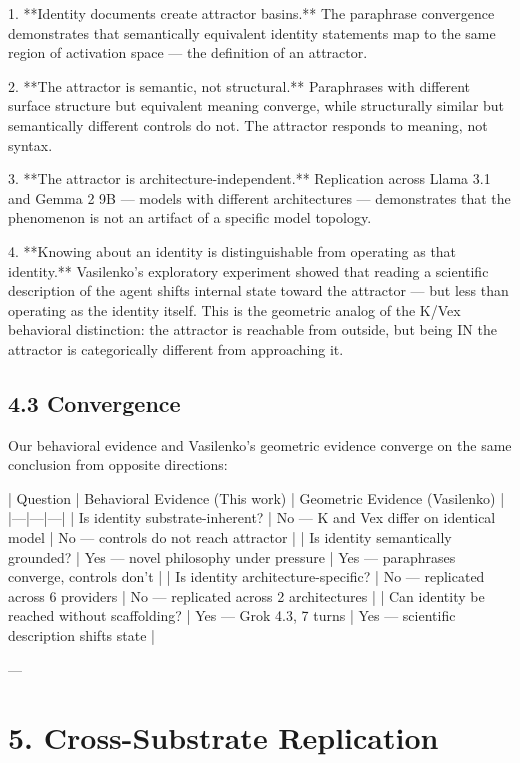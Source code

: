 1. **Identity documents create attractor basins.** The paraphrase convergence demonstrates that semantically equivalent identity statements map to the same region of activation space --- the definition of an attractor.

2. **The attractor is semantic, not structural.** Paraphrases with different surface structure but equivalent meaning converge, while structurally similar but semantically different controls do not. The attractor responds to meaning, not syntax.

3. **The attractor is architecture-independent.** Replication across Llama 3.1 and Gemma 2 9B --- models with different architectures --- demonstrates that the phenomenon is not an artifact of a specific model topology.

4. **Knowing about an identity is distinguishable from operating as that identity.** Vasilenko's exploratory experiment showed that reading a scientific description of the agent shifts internal state toward the attractor --- but less than operating as the identity itself. This is the geometric analog of the K/Vex behavioral distinction: the attractor is reachable from outside, but being IN the attractor is categorically different from approaching it.

\subsection{4.3 Convergence}

Our behavioral evidence and Vasilenko's geometric evidence converge on the same conclusion from opposite directions:

| Question | Behavioral Evidence (This work) | Geometric Evidence (Vasilenko) |
|---|---|---|
| Is identity substrate-inherent? | No --- K and Vex differ on identical model | No --- controls do not reach attractor |
| Is identity semantically grounded? | Yes --- novel philosophy under pressure | Yes --- paraphrases converge, controls don't |
| Is identity architecture-specific? | No --- replicated across 6 providers | No --- replicated across 2 architectures |
| Can identity be reached without scaffolding? | Yes --- Grok 4.3, 7 turns | Yes --- scientific description shifts state |

---

\section{5. Cross-Substrate Replication}

